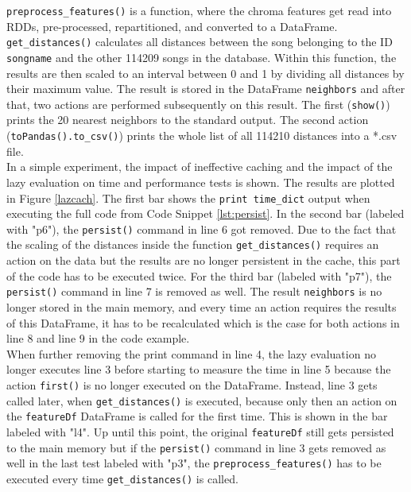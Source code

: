 \noindent \lstinline{preprocess_features()} is a function, where the chroma features get read into RDDs, pre-processed, repartitioned, and converted to a DataFrame. \lstinline{get_distances()} calculates all distances between the song belonging to the ID \lstinline{songname} and the other 114209 songs in the database. Within this function, the results are then scaled to an interval between 0 and 1 by dividing all distances by their maximum value. The result is stored in the DataFrame \lstinline{neighbors} and after that, two actions are performed subsequently on this result. The first (\lstinline{show()}) prints the 20 nearest neighbors to the standard output. The second action (\lstinline{toPandas().to_csv()}) prints the whole list of all 114210 distances into a *.csv file.\\
In a simple experiment, the impact of ineffective caching and the impact of the lazy evaluation on time and performance tests is shown. The results are plotted in Figure \ref{lazcach}. The first bar shows the \lstinline{print time_dict} output when executing the full code from Code Snippet \ref{lst:persist}. In the second bar (labeled with "p6"), the \lstinline{persist()} command in line 6 got removed. Due to the fact that the scaling of the distances inside the function \lstinline{get_distances()} requires an action on the data but the results are no longer persistent in the cache, this part of the code has to be executed twice. For the third bar (labeled with "p7"), the \lstinline{persist()} command in line 7 is removed as well. The result \lstinline{neighbors} is no longer stored in the main memory, and every time an action requires the results of this DataFrame, it has to be recalculated which is the case for both actions in line 8 and line 9 in the code example.\\
When further removing the print command in line 4, the lazy evaluation no longer executes line 3 before starting to measure the time in line 5 because the action \lstinline{first()} is no longer executed on the DataFrame. Instead, line 3 gets called later, when \lstinline{get_distances()} is executed, because only then an action on the \lstinline{featureDf} DataFrame is called for the first time. This is shown in the bar labeled with "l4". Up until this point, the original \lstinline{featureDf} still gets persisted to the main memory but if the \lstinline{persist()} command in line 3 gets removed as well in the last test labeled with "p3", the \lstinline{preprocess_features()} has to be executed every time \lstinline{get_distances()} is called.  

